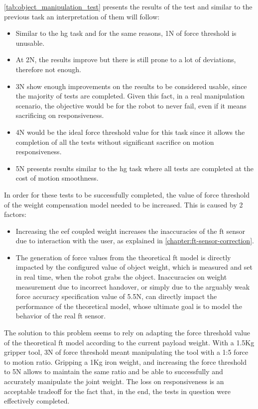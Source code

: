 \par \autoref{tab:object_manipulation_test} presents the results of the test and similar to the previous task an interpretation of them will follow: 
\begin{itemize}
    \item Similar to the \ac{hg} task and for the same reasons, 1N of force threshold is unusable.
    \item At 2N, the results improve but there is still prone to a lot of deviations, therefore not enough.
    \item 3N show enough improvements on the results to be considered usable, since the majority of tests are completed. Given this fact, in a real manipulation scenario, the objective would be for the robot to never fail, even if it means sacrificing on responsiveness.
    \item 4N would be the ideal force threshold value for this task since it allows the completion of all the tests without significant sacrifice on motion responsiveness.
    \item 5N presents results similar to the \ac{hg} task where all tests are completed at the cost of motion smoothness.
\end{itemize}

\par In order for these tests to be successfully completed, the value of force threshold of the weight compensation model needed to be increased. This is caused by 2 factors: 

\begin{itemize}
    \item Increasing the \ac{eef} coupled weight increases the inaccuracies of the \ac{ft} sensor due to interaction with the user, as explained in \autoref{chapter:ft-sensor-correction}.
    \item The generation of force values from the theoretical \ac{ft} model is directly impacted by the configured value of object weight, which is measured and set in real time, when the robot grabs the object. Inaccuracies on weight measurement due to incorrect handover, or simply due to the arguably weak force accuracy specification value of 5.5N, can directly impact the performance of the theoretical model, whose ultimate goal is to model the behavior of the real \ac{ft} sensor.
\end{itemize}

\par The solution to this problem seems to rely on adapting the force threshold value of the theoretical \ac{ft} model according to the current payload weight. With a 1.5Kg gripper tool, 3N of force threshold meant manipulating the tool with a 1:5 force to motion ratio. Gripping a 1Kg iron weight, and increasing the force threshold to 5N allows to maintain the same ratio and be able to successfully and accurately manipulate the joint weight. The loss on responsiveness is an acceptable tradeoff for the fact that, in the end, the tests in question were effectively completed. 

